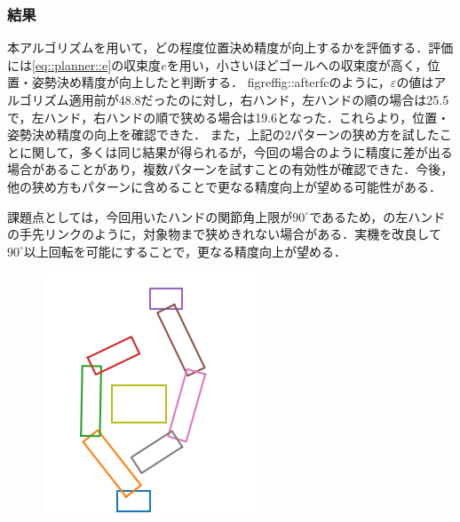 \documentclass[a4paper,twoside,12pt,papersize, dvipdfmx]{iirthesis}
\begin{document}
{\subsubsection{結果}
本アルゴリズムを用いて，どの程度位置決め精度が向上するかを評価する．評価には\eqref{eq::planner::e}の収束度$e$を用い，小さいほどゴールへの収束度が高く，位置・姿勢決め精度が向上したと判断する．
figref{fig::afterfc}のように，$\varepsilon$の値はアルゴリズム適用前が48.8だったのに対し，右ハンド，左ハンドの順の場合は25.5で，左ハンド，右ハンドの順で狭める場合は19.6となった．これらより，位置・姿勢決め精度の向上を確認できた．
また，上記の2パターンの狭め方を試したことに関して，多くは同じ結果が得られるが，今回の場合のように精度に差が出る場合があることがあり，複数パターンを試すことの有効性が確認できた．今後，他の狭め方もパターンに含めることで更なる精度向上が望める可能性がある．　\par
課題点としては，今回用いたハンドの関節角上限が$90^{\circ}$であるため，の左ハンドの手先リンクのように，対象物まで狭めきれない場合がある．実機を改良して$90^{\circ}$以上回転を可能にすることで，更なる精度向上が望める．
\begin{figure}[b]
\centering
\begin{minipage}{0.33\hsize}
\includegraphics[width=0.9\hsize]{fig/3-new-planner/rec_before_FC.png}
\label{fig::planner::beforefc}

\end{minipage}
\end{figure}}
\end{document}
